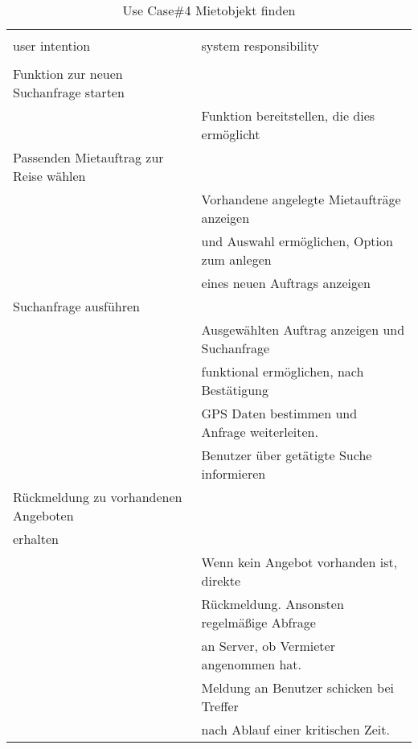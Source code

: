 \begin{table}[H]
\caption{Use Case\#4 Mietobjekt finden }
\centering
\begin{tabular}{l l}
\\ [-0.5ex]

\hline\hline
\\ [-0.5ex]
user intention & system responsibility
\\ [1.5ex]
\hline
\\ [-0.5ex]
Funktion zur neuen Suchanfrage starten 	& 											 	\\[1ex]
										& Funktion bereitstellen, die dies ermöglicht	\\[1ex]
Passenden Mietauftrag zur Reise wählen	& 												\\[1ex]
										& Vorhandene angelegte Mietaufträge anzeigen	\\[1ex]
										& und Auswahl ermöglichen, Option zum anlegen   \\[1ex]
										& eines neuen Auftrags anzeigen					\\[1ex]
Suchanfrage ausführen 					& 												\\[1ex] 
										& Ausgewählten Auftrag anzeigen	und Suchanfrage	\\[1ex]
										& funktional ermöglichen, nach Bestätigung 		\\[1ex]
										& GPS Daten bestimmen und Anfrage weiterleiten.	\\[1ex]
										& Benutzer über getätigte Suche informieren		\\[1ex]
Rückmeldung zu vorhandenen Angeboten	& 												\\[1ex]
erhalten								& 												\\[1ex]
										& Wenn kein Angebot vorhanden ist, direkte		\\[1ex]
										& Rückmeldung. Ansonsten regelmäßige Abfrage 	\\[1ex]
										& an Server, ob Vermieter angenommen hat.		\\[1ex]
										& Meldung an Benutzer schicken bei Treffer 		\\[1ex]
										& nach Ablauf einer kritischen Zeit.				\\[1ex]
\hline
\end{tabular}
\label{tab:mietobjektUC}
\end{table}

